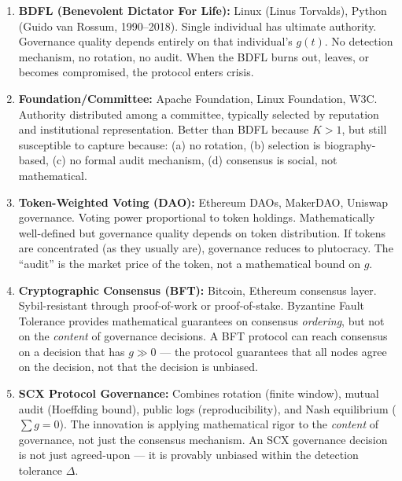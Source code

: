 \documentclass[12pt,a4paper]{article}
\theoremstyle{remark}
\begin{document}
\begin{enumerate}[label=(\arabic*), leftmargin=*]
    \item \textbf{BDFL (Benevolent Dictator For Life):} Linux (Linus Torvalds),
          Python (Guido van Rossum, 1990--2018). Single individual has ultimate
          authority. Governance quality depends entirely on that individual's
          $g(t)$. No detection mechanism, no rotation, no audit. When the BDFL
          burns out, leaves, or becomes compromised, the protocol enters crisis.
    
    \item \textbf{Foundation/Committee:} Apache Foundation, Linux Foundation,
          W3C. Authority distributed among a committee, typically selected by
          reputation and institutional representation. Better than BDFL because
          $K > 1$, but still susceptible to capture because: (a) no rotation,
          (b) selection is biography-based, (c) no formal audit mechanism,
          (d) consensus is social, not mathematical.
    
    \item \textbf{Token-Weighted Voting (DAO):} Ethereum DAOs, MakerDAO,
          Uniswap governance. Voting power proportional to token holdings.
          Mathematically well-defined but governance quality depends on token
          distribution. If tokens are concentrated (as they usually are),
          governance reduces to plutocracy. The ``audit'' is the market price
          of the token, not a mathematical bound on $g$.
    
    \item \textbf{Cryptographic Consensus (BFT):} Bitcoin, Ethereum consensus
          layer. Sybil-resistant through proof-of-work or proof-of-stake.
          Byzantine Fault Tolerance provides mathematical guarantees on
          consensus \textit{ordering}, but not on the \textit{content} of
          governance decisions. A BFT protocol can reach consensus on a
          decision that has $g \gg 0$ — the protocol guarantees that all nodes
          agree on the decision, not that the decision is unbiased.
    
    \item \textbf{SCX Protocol Governance:} Combines rotation (finite window),
          mutual audit (Hoeffding bound), public logs (reproducibility), and
          Nash equilibrium ($\sum g = 0$). The innovation is applying
          mathematical rigor to the \textit{content} of governance, not just
          the consensus mechanism. An SCX governance decision is not just
          agreed-upon — it is provably unbiased within the detection tolerance
          $\Delta$.
\end{enumerate}
\end{document}
